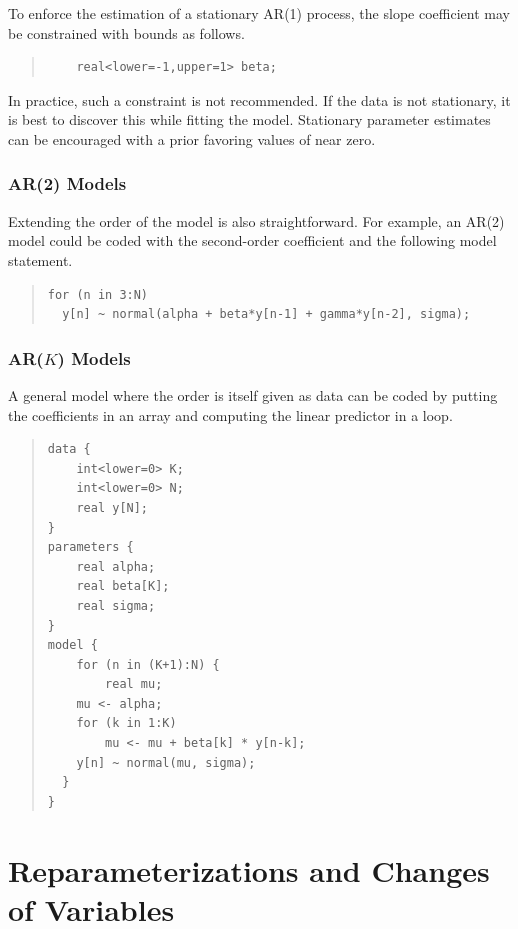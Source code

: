 To enforce the estimation of a stationary AR(1) process, the slope
coefficient  may be constrained with bounds as follows.
%
\begin{quote}
\begin{Verbatim}
    real<lower=-1,upper=1> beta;
\end{Verbatim}
\end{quote}
%
In practice, such a constraint is not recommended.  If the data is not
stationary, it is best to discover this while fitting the model.
Stationary parameter estimates can be encouraged with a prior favoring
values of  near zero.


\subsection{AR(2) Models}

Extending the order of the model is also straightforward.  For
example, an AR(2) model could be coded with the second-order
coefficient  and the following model statement.
%
\begin{quote}
\begin{Verbatim}
for (n in 3:N)
  y[n] ~ normal(alpha + beta*y[n-1] + gamma*y[n-2], sigma);
\end{Verbatim}
\end{quote}


\subsection{AR($K$) Models}

A general model where the order is itself given as data can be coded
by putting the coefficients in an array and computing the linear
predictor in a loop.
%
\begin{quote}
\begin{Verbatim}
data {
    int<lower=0> K;
    int<lower=0> N;
    real y[N];
}
parameters {
    real alpha;
    real beta[K];
    real sigma;
}
model {
    for (n in (K+1):N) {
        real mu;
    mu <- alpha;
    for (k in 1:K)
        mu <- mu + beta[k] * y[n-k];
    y[n] ~ normal(mu, sigma);
  }
}
\end{Verbatim}
\end{quote}

\chapter{Reparameterizations and Changes of Variables}
\label{change-of-variables.chapter}

